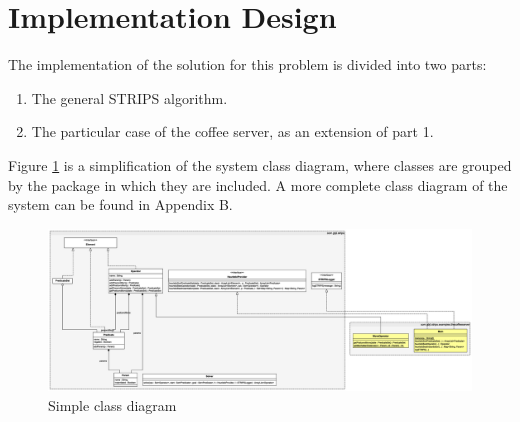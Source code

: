 \documentclass[12pt,a4paper,oneside]{article}
\numberwithin{equation}{section}
\numberwithin{equation}{section}
\theoremstyle{definition}
\begin{document}
\newpage

\section{Implementation Design} \label{Implementation Design}

The implementation of the solution for this problem is divided into two parts:
\begin{enumerate}
	\item The general STRIPS algorithm.
	\item The particular case of the coffee server, as an extension of part 1.
\end{enumerate}
Figure \ref{simplediagram} is a simplification of the system class diagram, where classes are grouped by the package in which they are included. A more complete class diagram of the system can be found in Appendix B.

\begin{figure}[h!]
	\begin{center}
	\includegraphics[scale=0.22]{simple}
	\end{center}
	\caption{Simple class diagram}
	\label{simplediagram}
\end{figure}
\end{document}
